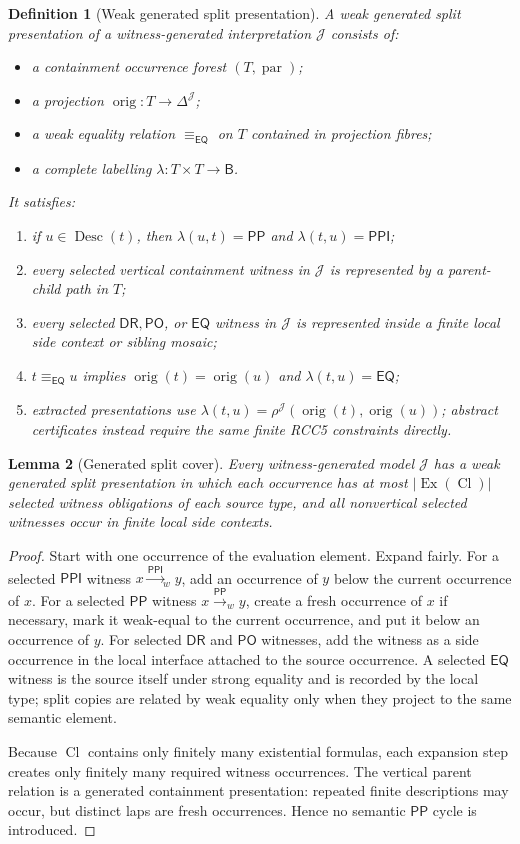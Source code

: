 \documentclass[11pt]{article}
\newtheorem{definition}{Definition}[section]
\newtheorem{lemma}[definition]{Lemma}
\theoremstyle{remark}
\newcommand{\Base}{\mathsf{B}}
\newcommand{\DR}{\mathsf{DR}}
\newcommand{\PO}{\mathsf{PO}}
\newcommand{\PP}{\mathsf{PP}}
\newcommand{\PPI}{\mathsf{PPI}}
\newcommand{\EQ}{\mathsf{EQ}}
\newcommand{\Cl}{\operatorname{Cl}}
\newcommand{\Ex}{\operatorname{Ex}}
\newcommand{\orig}{\operatorname{orig}}
\newcommand{\parr}{\operatorname{par}}
\newcommand{\Desc}{\operatorname{Desc}}
\newcommand{\Eq}{\equiv_{\EQ}}
\newcommand{\J}{\mathcal{J}}
\begin{document}
\begin{definition}[Weak generated split presentation]
A weak generated split presentation of a witness-generated interpretation $\J$ consists of:
\begin{itemize}
\item a containment occurrence forest $(T,\parr)$;
\item a projection $\orig:T\to\Delta^\J$;
\item a weak equality relation $\Eq$ on $T$ contained in projection fibres;
\item a complete labelling $\lambda:T\times T\to\Base$.
\end{itemize}
It satisfies:
\begin{enumerate}[label=(S\arabic*)]
\item if $u\in\Desc(t)$, then $\lambda(u,t)=\PP$ and $\lambda(t,u)=\PPI$;
\item every selected vertical containment witness in $\J$ is represented by a parent-child path in $T$;
\item every selected $\DR,\PO$, or $\EQ$ witness in $\J$ is represented inside a finite local side context or sibling mosaic;
\item $t\Eq u$ implies $\orig(t)=\orig(u)$ and $\lambda(t,u)=\EQ$;
\item extracted presentations use $\lambda(t,u)=\rho^\J(\orig(t),\orig(u))$; abstract certificates instead require the same finite RCC5 constraints directly.
\end{enumerate}
\end{definition}

\begin{lemma}[Generated split cover]\label{lem:split-cover}
Every witness-generated model $\J$ has a weak generated split presentation in which each occurrence has at most $|\Ex(\Cl)|$ selected witness obligations of each source type, and all nonvertical selected witnesses occur in finite local side contexts.
\end{lemma}
\begin{proof}
Start with one occurrence of the evaluation element.  Expand fairly.  For a selected $\PPI$ witness $x\xrightarrow{\PPI}_{w}y$, add an occurrence of $y$ below the current occurrence of $x$.  For a selected $\PP$ witness $x\xrightarrow{\PP}_{w}y$, create a fresh occurrence of $x$ if necessary, mark it weak-equal to the current occurrence, and put it below an occurrence of $y$.  For selected $\DR$ and $\PO$ witnesses, add the witness as a side occurrence in the local interface attached to the source occurrence.  A selected $\EQ$ witness is the source itself under strong equality and is recorded by the local type; split copies are related by weak equality only when they project to the same semantic element.

Because $\Cl$ contains only finitely many existential formulas, each expansion step creates only finitely many required witness occurrences.  The vertical parent relation is a generated containment presentation: repeated finite descriptions may occur, but distinct laps are fresh occurrences.  Hence no semantic $\PP$ cycle is introduced.
\end{proof}
\end{document}
